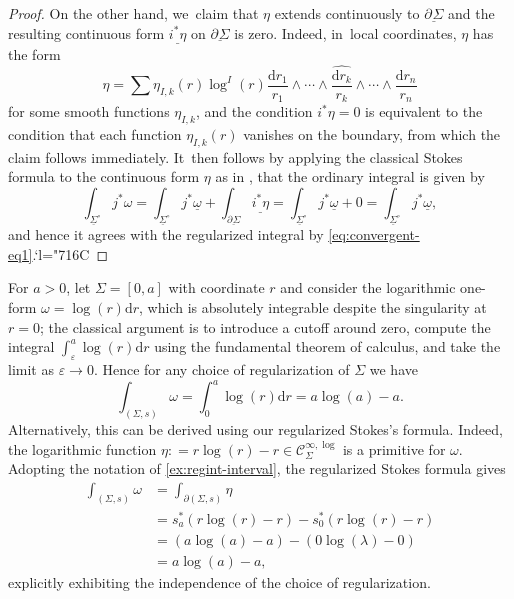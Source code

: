\documentclass[JEP,XML,SOM,Unicode,NoFloatCountersInSection,published]{cedram}
\newcommand{\Changelback}{\mathcode`l="716C}
\theoremstyle{definition}
\theoremstyle{remark}
\newenvironment{example}
  {\pushQED{\qed}\renewcommand{\qedsymbol}{$\lozenge$}\examplex}
  {\popQED\endexamplex}
\newcommand{\defas}{\mathrel{\mathop:}=}
\let\epsilon\varepsilon
\newcommand{\Cinflog}[1]{\mathscr{C}^{\infty,\log}_{#1}}
\newcommand{\dd}{\mathrm{d}}
\newcommand{\dlog}[1]{\frac{\dd#1}{#1}}
\newcommand{\Sig}{\Sigma}
\newcommand{\uSigo}{\underline{\Sigma}^\circ}
\newcommand{\ubdSig}[1][]{\underline{\partial^{#1}\Sigma}}
\begin{document}
\begin{proof}
On the other hand, we~claim that $\eta$ extends continuously to $\ubdSig$ and the resulting continuous form $\underline{i^*\eta}$ on $\ubdSig$ is zero. Indeed, in~local coordinates, $\eta$ has the form\vspace*{-3pt}
\[
\eta = \sum \eta_{I,k}(r) \log^I(r) \dlog{r_1}\wedge \cdots \wedge \widehat{\dlog{r_k}} \wedge \cdots \wedge \dlog{r_n}
\]
for some smooth functions $\eta_{I,k}$, and the condition $i^*\eta=0$ is equivalent to the condition that each function $\eta_{I,k}(r)$ vanishes on the boundary, from which the claim follows immediately. It~then follows by applying the classical Stokes formula to the continuous form $\eta$ as in \cite[Th.\,4.11]{Brown2009}, that the ordinary integral is given by\vspace*{-3pt}
\[
\int_{\uSigo}j^*\omega = \int_{\uSigo}j^*{\underline{\omega}} + \int_{\ubdSig} \underline{i^*\eta} = \int_{\uSigo}j^*{\underline{\omega}} + 0 = \int_{\uSigo}j^*{\underline{\omega}},
\]
and hence it agrees with the regularized integral by \eqref{eq:convergent-eq1}.\Changelback
\end{proof}

\begin{example}
For $a > 0$, let $\Sig = [0,a]$ with coordinate $r$ and consider the logarithmic one-form $\omega = \log(r)\dd r$, which is absolutely integrable despite the singularity at $r=0$; the classical argument is to introduce a cutoff around zero, compute the integral $\int_{\epsilon}^a \log(r)\dd r$ using the fundamental theorem of calculus, and take the limit as $\epsilon \to 0$.
Hence for any choice of regularization of $\Sig$ we have\vspace*{-3pt}
\[
\int_{(\Sig,s)} \omega = \int_0^a \log(r) \dd r = a \log(a) - a.
\]
Alternatively, this can be derived using our regularized Stokes's formula. Indeed, the logarithmic function $\eta \defas r \log(r) - r \in \Cinflog{\Sig}$ is a primitive for $\omega$. Adopting the notation of \autoref{ex:regint-interval}, the regularized Stokes formula gives\vspace*{-3pt}
\begin{align*}
\int_{(\Sig,s)} \omega &= \int_{\partial(\Sig,s)}\eta\\
&= s_a^* (r\log(r) -r ) - s_0^*(r\log(r) - r) \\
&= (a\log(a) -a ) - (0\log(\lambda) - 0) \\
&= a\log(a) - a,
\end{align*}
explicitly exhibiting the independence of the choice of regularization.
\end{example}
\end{document}
